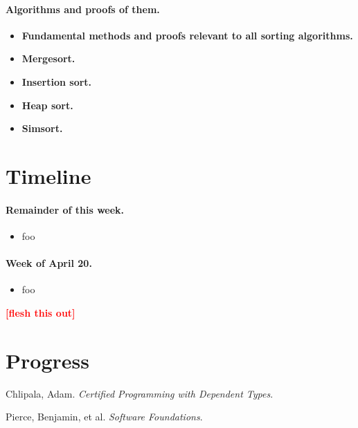 \documentclass{article}
\newcommand{\todo}[1]{\textcolor{red}{\textbf{\textsf{[#1]}}}}
\begin{document}
\paragraph{Algorithms and proofs of them.}
\begin{itemize}
  \item \textbf{Fundamental methods and proofs relevant to all
                sorting algorithms.}
  \item \textbf{Mergesort.}
  \item \textbf{Insertion sort.}
  \item \textbf{Heap sort.}
  \item \textbf{Simsort.}
\end{itemize}


\section{Timeline}
\paragraph{Remainder of this week.}
\begin{itemize}
  \item
    foo
\end{itemize}

\paragraph{Week of April 20.}
\begin{itemize}
  \item
    foo
\end{itemize}

\todo{flesh this out}

\section{Progress}


\begin{thebibliography}{xx}
    Chlipala, Adam. \emph{Certified Programming with Dependent Types}.

    Pierce, Benjamin, et al. \emph{Software Foundations}.

%
\end{thebibliography}
\end{document}
